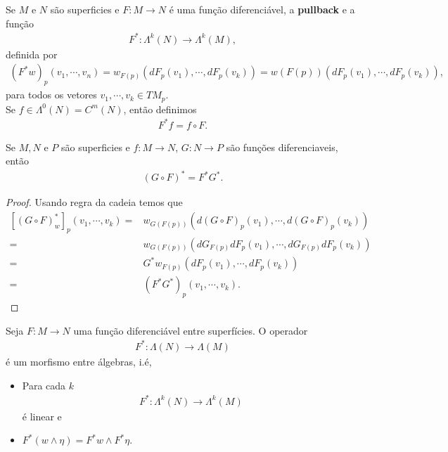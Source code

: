 \begin{definition}[Pullback]
  Se $M$ e $N$ são superficies e $F:M\to N$ é uma função diferenciável, a \textbf{pullback} e a função
  \begin{align*}
    F^{\ast}:\Lambda^{k}(N)\to\Lambda^{k}(M),
  \end{align*}
  definida por
  \begin{align*}
    (F^{\ast}w)_{p}(v_1,\cdots,v_n)=w_{F(p)}\left( dF_p(v_1),\cdots,dF_p(v_k) \right)=w(F(p))\left( dF_p(v_1),\cdots,dF_p(v_k) \right),
  \end{align*}
  para todos os vetores $v_1,\cdots,v_k\in TM_p$.\\
  Se $f\in\Lambda^{0}(N)=C^{m}(N)$, então definimos
  \begin{align*}
    F^{\ast}f=f\circ F.
  \end{align*}
\end{definition}
\begin{proposition}
  Se $M,N$ e $P$ são superficies e $f:M\to N$, $G:N\to P$ são funções diferenciaveis, então
  \begin{align*}
    (G\circ F)^{\ast}=F^{\ast}G^{\ast}.
  \end{align*}
\end{proposition}
\begin{proof}
  Usando regra da cadeia temos que
  \begin{align*}
    \left[ (G\circ F)^{\ast}_{w} \right]_{p}(v_1,\cdots,v_k)=&w_{G(F(p))}(d(G\circ F)_p(v_1),\cdots,d(G\circ F)_p(v_k))\\
    =&w_{G(F(p))}(dG_{F(p)}dF_p(v_1),\cdots,dG_{F(p)}dF_p(v_k))\\
    =&G^{\ast}w_{F(p)}(dF_p(v_1),\cdots,dF_p(v_k))\\
    =&(F^{\ast}G^{\ast})_{p}(v_1,\cdots,v_k).
  \end{align*}
\end{proof}
\begin{proposition}
  Seja $F:M\to N$ uma função diferenciável entre superfícies. O operador
  \begin{align*}
    F^{\ast}:\Lambda(N)\to\Lambda(M)
  \end{align*}
  é um morfismo entre álgebras, i.é,
  \begin{itemize}
    \item Para cada $k$
      \begin{align*}
        F^{\ast}:\Lambda^{k}(N)\to\Lambda^{k}(M)
      \end{align*}
      é linear e
    \item $F^{\ast}(w\wedge\eta)=F^{\ast}w\wedge F^{\ast}\eta$.
  \end{itemize}
\end{proposition}
